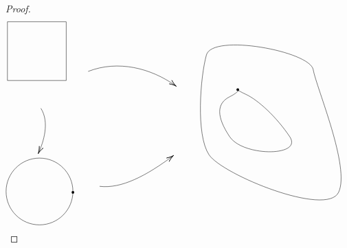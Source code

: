 \documentclass{article}
\begin{document}
\begin{proof}
\[\begin{tikzpicture}[x=0.75pt,y=0.75pt,yscale=-1,xscale=1]
    \draw   (85,55) -- (173.11,55) -- (173.11,143.11) -- (85,143.11) -- cycle ;
    \draw    (135.11,184.78) .. controls (148.62,206.01) and (138.85,235.62) .. (131.86,251.15) ;
    \draw [shift={(131.11,252.78)}, rotate = 295.02] [color={rgb, 255:red, 0; green, 0; blue, 0 }  ][line width=0.75]    (10.93,-3.29) .. controls (6.95,-1.4) and (3.31,-0.3) .. (0,0) .. controls (3.31,0.3) and (6.95,1.4) .. (10.93,3.29)   ;
    \draw   (83,309.5) .. controls (83,281.86) and (105.41,259.44) .. (133.06,259.44) .. controls (160.7,259.44) and (183.11,281.86) .. (183.11,309.5) .. controls (183.11,337.14) and (160.7,359.56) .. (133.06,359.56) .. controls (105.41,359.56) and (83,337.14) .. (83,309.5) -- cycle ;
    \draw  [line width=3] [line join = round][line cap = round] (183.11,310.78) .. controls (183.11,310.78) and (183.11,310.78) .. (183.11,310.78) ;
    \draw   (383.11,104.78) .. controls (392.22,72.11) and (538.22,99.11) .. (543.11,126.78) .. controls (548,154.44) and (599,273.44) .. (581.11,310.78) .. controls (563.22,348.11) and (407,284.44) .. (387,254.44) .. controls (367,224.44) and (374,137.44) .. (383.11,104.78) -- cycle ;
    \draw   (418,167.44) .. controls (438,157.44) and (424,155.44) .. (442.11,163.78) .. controls (460.22,172.11) and (488,197.44) .. (508,227.44) .. controls (528,257.44) and (438,257.44) .. (418,227.44) .. controls (398,197.44) and (398,177.44) .. (418,167.44) -- cycle ;
    \draw  [line width=3] [line join = round][line cap = round] (430.11,156.78) .. controls (430.11,156.78) and (430.11,156.78) .. (430.11,156.78) ;
    \draw    (206,129.44) .. controls (250.66,111.95) and (300.11,124.52) .. (337,150.97) ;
    \draw [shift={(338.11,151.78)}, rotate = 216.12] [color={rgb, 255:red, 0; green, 0; blue, 0 }  ][line width=0.75]    (10.93,-3.29) .. controls (6.95,-1.4) and (3.31,-0.3) .. (0,0) .. controls (3.31,0.3) and (6.95,1.4) .. (10.93,3.29)   ;
    \draw    (223.11,301.78) .. controls (255.78,305.74) and (293.24,285.85) .. (332.8,256.34) ;
    \draw [shift={(334,255.44)}, rotate = 143.13] [color={rgb, 255:red, 0; green, 0; blue, 0 }  ][line width=0.75]    (10.93,-3.29) .. controls (6.95,-1.4) and (3.31,-0.3) .. (0,0) .. controls (3.31,0.3) and (6.95,1.4) .. (10.93,3.29)   ;
    

\end{tikzpicture}\]
\end{proof}
\end{document}

